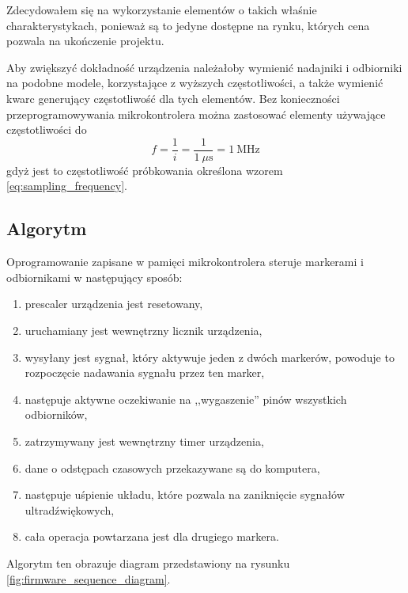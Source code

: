 Zdecydowałem się na wykorzystanie elementów  o takich właśnie charakterystykach, ponieważ są to jedyne dostępne na rynku, których cena pozwala na ukończenie projektu.

Aby zwiększyć dokładność urządzenia należałoby wymienić nadajniki i odbiorniki na podobne modele, korzystające z wyższych częstotliwości, a także wymienić kwarc generujący częstotliwość dla tych elementów. Bez konieczności przeprogramowywania mikrokontrolera można zastosować elementy używające częstotliwości do
\begin{equation}
 f = \frac{1}{i} = \frac{1}{1~\mu\textrm{s}} = 1~\textrm{MHz}
\end{equation}
gdyż jest to częstotliwość próbkowania określona wzorem \ref{eq:sampling_frequency}.

\subsection{Algorytm}
\label{sec:uc_algorithm}
Oprogramowanie zapisane w pamięci mikrokontrolera steruje markerami i odbiornikami w następujący sposób:
\begin{enumerate}
 \item {}prescaler urządzenia jest resetowany,\label{enum:prescaler}
 \item uruchamiany jest wewnętrzny licznik urządzenia,
 \item wysyłany jest sygnał, który aktywuje jeden z dwóch markerów, powoduje to rozpoczęcie nadawania sygnału przez ten marker,
 \item następuje aktywne oczekiwanie na ,,wygaszenie'' pinów wszystkich odbiorników,
 \item zatrzymywany jest wewnętrzny timer urządzenia,
 \item dane o odstępach czasowych przekazywane są do komputera,
 \item następuje uśpienie układu, które pozwala na zaniknięcie sygnałów ultradźwiękowych,
 \item cała operacja powtarzana jest dla drugiego markera.
\end{enumerate}
Algorytm ten obrazuje diagram przedstawiony na rysunku \ref{fig:firmware_sequence_diagram}.

